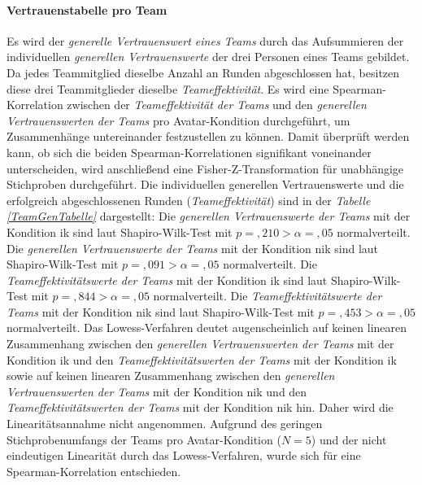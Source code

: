 \documentclass[a4paper,11pt]{article}%
\renewcommand{\\}{\vspace*{0.5\baselineskip} \newline}
\begin{document}
{\paragraph{Vertrauenstabelle pro Team}
Es wird der \textit{generelle Vertrauenswert eines Teams} durch das Aufsummieren der individuellen \textit{generellen Vertrauenswerte} der drei Personen eines Teams gebildet.
Da jedes Teammitglied dieselbe Anzahl an Runden abgeschlossen hat, besitzen diese drei Teammitglieder dieselbe \textit{Teameffektivität}.
Es wird eine Spearman-Korrelation zwischen der \textit{Teameffektivität der Teams} und den \textit{generellen Vertrauenswerten der Teams} pro Avatar-Kondition durchgeführt, um Zusammenhänge untereinander festzustellen zu können.
Damit überprüft werden kann, ob sich die beiden Spearman-Korrelationen signifikant voneinander unterscheiden, wird anschließend eine Fisher-Z-Transformation für unabhängige Stichproben durchgeführt. Die individuellen generellen Vertrauenswerte und die erfolgreich abgeschlossenen Runden (\textit{Teameffektivität}) sind in der \textit{Tabelle \ref{TeamGenTabelle}} dargestellt:\\
Die \textit{generellen Vertrauenswerte der Teams} mit der Kondition \ac{ik} sind laut Shapiro-Wilk-Test mit $p =,210 > \alpha = ,05$ normalverteilt. \newline
Die \textit{generellen Vertrauenswerte der Teams} mit der Kondition \ac{nik} sind laut Shapiro-Wilk-Test mit $p =,091 > \alpha = ,05$ normalverteilt. \newline
Die \textit{Teameffektivitätswerte der Teams} mit der Kondition \ac{ik} sind laut Shapiro-Wilk-Test mit $p =,844 > \alpha = ,05$ normalverteilt. \newline
Die \textit{Teameffektivitätswerte der Teams} mit der Kondition \ac{nik} sind laut Shapiro-Wilk-Test mit $p =,453 > \alpha = ,05$ normalverteilt. \\
Das Lowess-Verfahren deutet augenscheinlich auf keinen linearen Zusammenhang zwischen den \textit{generellen Vertrauenswerten der Teams} mit der Kondition \ac{ik} und den \textit{Teameffektivitätswerten der Teams} mit der Kondition \ac{ik} sowie auf keinen linearen Zusammenhang zwischen den \textit{generellen Vertrauenswerten der Teams} mit der Kondition \ac{nik} und den \textit{Teameffektivitätswerten der Teams} mit der Kondition \ac{nik} hin. Daher wird die Linearitätsannahme nicht angenommen.\\
Aufgrund des geringen Stichprobenumfangs der Teams pro Avatar-Kondition ($N=5$) und der nicht eindeutigen Linearität durch das Lowess-Verfahren, wurde sich für eine Spearman-Korrelation entschieden.

}
\end{document}
